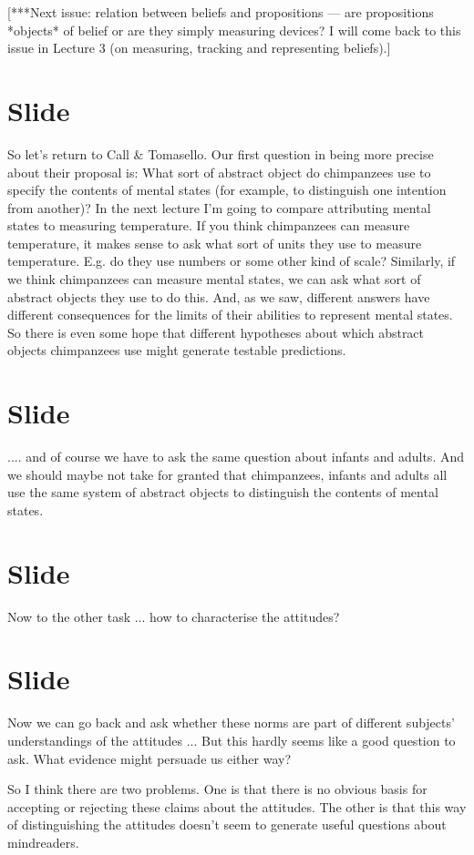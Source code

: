 \documentclass[12pt,\papersize]{extarticle}
\begin{document}
[***Next issue: relation between beliefs and propositions --- are propositions *objects* of belief or are they simply measuring devices?
I will come back to this issue in Lecture 3 (on measuring, tracking and representing beliefs).]


\section{Slide}
So let’s return to Call \& Tomasello. 
Our first question in being more precise about their proposal is: What sort of abstract object do chimpanzees use to specify the contents of mental states (for example, to distinguish one intention from another)?
In the next lecture I’m going to compare attributing mental states to measuring temperature.
If you think chimpanzees can measure temperature, it makes sense to ask what sort of units they use to measure temperature.  E.g. do they use numbers or some other kind of scale?
Similarly, if we think chimpanzees can measure mental states, we can ask what sort of abstract objects they use to do this.
And, as we saw, different answers have different consequences for the limits of their abilities to represent mental states.  
So there is even some hope that different hypotheses about which abstract objects chimpanzees use might generate testable predictions.


\section{Slide}
.... and of course we have to ask the same question about infants and adults.
And we should maybe not take for granted that chimpanzees, infants and adults all use the same system of abstract objects to distinguish the contents of mental states.


\section{Slide}
Now to the other task ... how to characterise the attitudes?  


\section{Slide}
Now we can go back and ask whether these norms are part of different subjects’ understandings of the attitudes ...
But this hardly seems like a good question to ask.
What evidence might persuade us either way?

So I think there are two problems.
One is that there is no obvious basis for accepting or rejecting these claims about the attitudes.
The other is that this way of distinguishing the attitudes doesn’t seem to generate useful questions about mindreaders.
\end{document}
